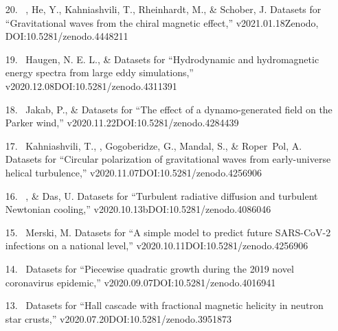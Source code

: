 \begin{itemize}
\item[{20.}~]
\Brandenburg, He, Y., Kahniashvili, T., Rheinhardt, M., \& Schober, J.
{Datasets for ``Gravitational waves from the chiral magnetic effect,''
v2021.01.18}{Zenodo, DOI:10.5281/zenodo.4448211}

\item[{19.}~]
Haugen, N. E. L., \& \Brandenburg{}
{Datasets for ``Hydrodynamic and hydromagnetic energy spectra from large eddy simulations,''
v2020.12.08}{DOI:10.5281/zenodo.4311391}

\item[{18.}~]
Jakab, P., \& \Brandenburg{}
{Datasets for ``The effect of a dynamo-generated field on the Parker wind,''
v2020.11.22}{DOI:10.5281/zenodo.4284439}

\item[{17.}~]
Kahniashvili, T., \Brandenburg, Gogoberidze, G., Mandal, S., \& Roper~Pol, A.
{Datasets for ``Circular polarization of gravitational waves from early-universe helical turbulence,''
v2020.11.07}{DOI:10.5281/zenodo.4256906}

\item[{16.}~]
\Brandenburg, \& Das, U.
{Datasets for ``Turbulent radiative diffusion and turbulent Newtonian cooling,'' v2020.10.13b}{DOI:10.5281/zenodo.4086046}

\item[{15.}~]
Merski, M.
{Datasets for ``A simple model to predict future SARS-CoV-2 infections on a national level,''
v2020.10.11}{DOI:10.5281/zenodo.4256906}

\item[{14.}~]
\Brandenburg{}
{Datasets for ``Piecewise quadratic growth during the 2019 novel coronavirus epidemic,'' v2020.09.07}{DOI:10.5281/zenodo.4016941}

\item[{13.}~]
\Brandenburg{}
{Datasets for ``Hall cascade with fractional magnetic helicity in neutron star crusts,'' v2020.07.20}{DOI:10.5281/zenodo.3951873}


\end{itemize}
